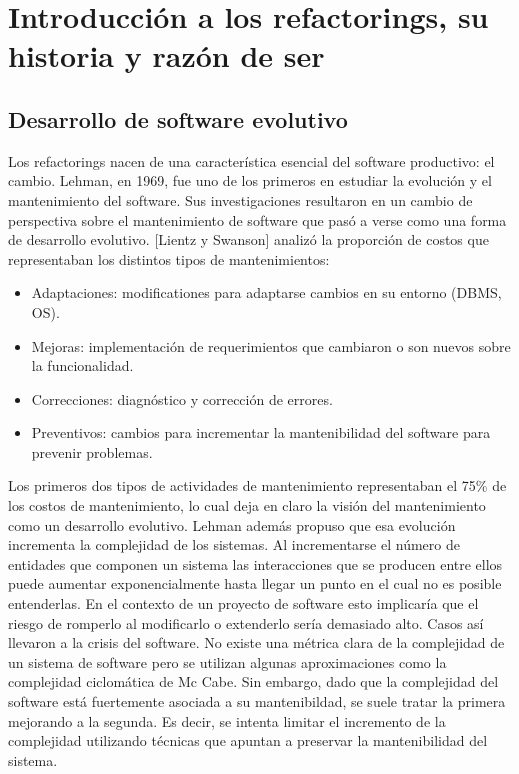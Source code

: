 \section{Introducción a los refactorings, su historia y razón de ser}
\subsection{Desarrollo de software evolutivo}
Los refactorings nacen de una característica esencial del software productivo: el cambio.
Lehman, en 1969, fue uno de los primeros en estudiar la evolución y el mantenimiento del software. Sus 
investigaciones resultaron en un cambio de perspectiva sobre el mantenimiento de software que pasó 
a verse como una forma de desarrollo evolutivo. 
[Lientz y Swanson] analizó la proporción de costos que representaban los distintos tipos de mantenimientos:

\begin{itemize}
    \item Adaptaciones: modificationes para adaptarse cambios en su entorno (DBMS, OS).
    \item Mejoras: implementación de requerimientos que cambiaron o son nuevos sobre la funcionalidad.
    \item Correcciones: diagnóstico y corrección de errores.
    \item Preventivos: cambios para incrementar la mantenibilidad del software para prevenir problemas.
\end{itemize}

Los primeros dos tipos de actividades de mantenimiento representaban el 75\% de los costos de mantenimiento,
lo cual deja en claro la visión del mantenimiento como un desarrollo evolutivo. Lehman además propuso
que esa evolución incrementa la complejidad de los sistemas. Al incrementarse el número de entidades
que componen un sistema las interacciones que se producen entre ellos puede aumentar exponencialmente
hasta llegar un punto en el cual no es posible entenderlas. En el contexto de un proyecto de software
esto implicaría que el riesgo de romperlo al modificarlo o extenderlo sería demasiado alto. Casos así
llevaron a la crisis del software.
No existe una métrica clara de la complejidad de un sistema de software pero se utilizan algunas aproximaciones
como la complejidad ciclomática de Mc Cabe. Sin embargo, dado que la complejidad del software está fuertemente
asociada a su mantenibildad, se suele tratar la primera mejorando a la segunda. Es decir, se intenta
limitar el incremento de la complejidad utilizando técnicas que apuntan a preservar la mantenibilidad
del sistema.


